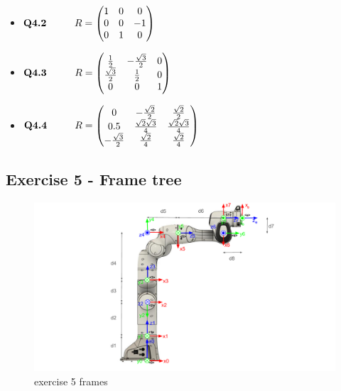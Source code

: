 \begin{itemize}
    \item $\textbf{Q4.2}\hspace{10mm} R = \begin{pmatrix}
        1 & 0 & 0 \\
        0 & 0 & -1 \\
        0 & 1 & 0
    \end{pmatrix}$
    
    \item $\textbf{Q4.3}\hspace{10mm} R = \begin{pmatrix}
        \frac{1}{2} & -\frac{\sqrt{3}}{2} & 0 \\
        \frac{\sqrt{3}}{2} & \frac{1}{2} & 0 \\
        0 & 0 & 1
    \end{pmatrix}$
    
    \item $\textbf{Q4.4}\hspace{10mm} R = \begin{pmatrix}
        0 & -\frac{\sqrt{2}}{2} & \frac{\sqrt{2}}{2} \\
        0.5 & \frac{\sqrt{2}\sqrt{3}}{4} & \frac{\sqrt{2}\sqrt{3}}{4} \\
        -\frac{\sqrt{3}}{2} & \frac{\sqrt{2}}{4} & \frac{\sqrt{2}}{4}
    \end{pmatrix}$
\end{itemize}

\subsection{Exercise 5 - Frame tree}

\begin{figure}
\centering
\includegraphics[width=1\linewidth]{Resources/franka.pdf}
\caption{exercise 5 frames}
\label{fig:ex2}
\end{figure}

